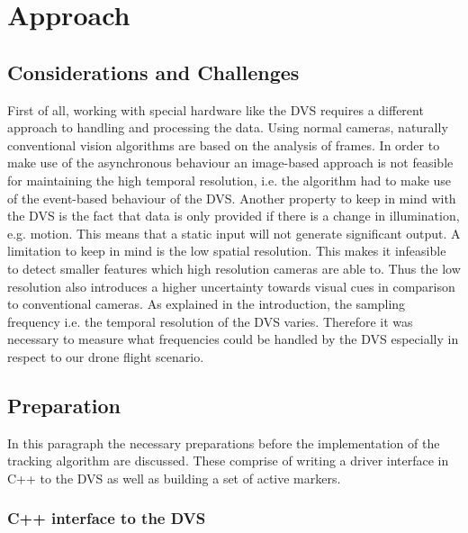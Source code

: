\chapter{Approach}\label{sec:approach}

\section{Considerations and Challenges}\label{sec:considerations}

First of all, working with special hardware like the DVS requires a different approach to handling and processing the data. Using normal cameras, naturally conventional vision algorithms are based on the analysis of frames. In order to make use of the asynchronous behaviour an image-based approach is not feasible for maintaining the high temporal resolution, i.e. the algorithm had to make use of the event-based behaviour of the DVS.
Another property to keep in mind with the DVS is the fact that data is only provided if there is a change in illumination, e.g. motion. This means that a static input will not generate significant output.
A limitation to keep in mind is the low spatial resolution. This makes it infeasible to detect smaller features which high resolution cameras are able to. Thus the low resolution also introduces a higher uncertainty towards visual cues in comparison to conventional cameras.
As explained in the introduction, the sampling frequency i.e. the temporal resolution of the DVS varies. Therefore it was necessary to measure what frequencies could be handled by the DVS especially in respect to our drone flight scenario.

\section{Preparation}\label{sec:preparation}

In this paragraph the necessary preparations before the implementation of the tracking algorithm are discussed. These comprise of writing a driver interface in C++ to the DVS as well as building a set of active markers.

\subsection{C++ interface to the DVS}\label{sec:interface}

